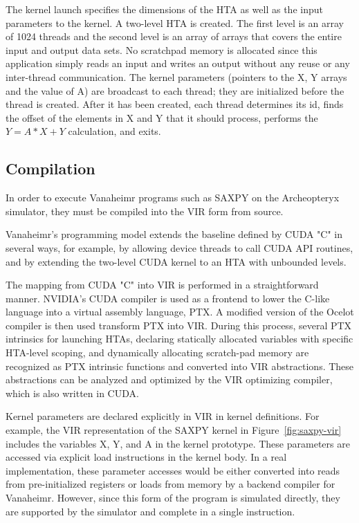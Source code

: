 \documentclass[conference, 10pt]{IEEEtran}
\begin{document}
The kernel launch specifies the dimensions of the HTA as well as the input
parameters to the kernel.  A two-level HTA is created.  The first level is an
array of 1024 threads and the second level is an array of arrays that covers
the entire input and output data sets.  No scratchpad memory is allocated since
this application simply reads an input and writes an output without any reuse
or any inter-thread communication.  The kernel parameters (pointers to the X, Y
arrays and the value of A) are broadcast to each thread; they are initialized
before the thread is created.  After it has been created, each thread determines
its id, finds the offset of the elements in X and Y that it should process,
performs the $Y = A*X+Y$ calculation, and exits.

\subsection{Compilation}

In order to execute Vanaheimr programs such as SAXPY on the Archeopteryx
simulator, they must be compiled into the VIR form from source.  

Vanaheimr's programming model extends the baseline defined by CUDA "C" in
several ways, for example, by allowing device threads to call CUDA API routines,
and by extending the two-level CUDA kernel to an HTA with unbounded levels.



The mapping from CUDA "C" into VIR is performed in a straightforward manner.
NVIDIA's CUDA compiler is used as a frontend to lower the C-like language into
a virtual assembly language, PTX.  A modified version of the Ocelot compiler is
then used transform PTX into VIR.  During this process, several PTX intrinsics
for launching HTAs, declaring statically allocated variables with specific
HTA-level scoping, and dynamically allocating scratch-pad memory are recognized
as PTX intrinsic functions and converted into VIR abstractions.  These
abstractions can be analyzed and optimized by the VIR optimizing compiler, which
is also written in CUDA.

Kernel parameters are declared explicitly in VIR in kernel definitions. 
For example, the VIR representation of the SAXPY kernel in 
Figure~\ref{fig:saxpy-vir} includes the variables X, Y, and A in the kernel
prototype.  These parameters are accessed via explicit load
instructions in the kernel body. In a real implementation, these parameter
accesses would be either converted into reads from pre-initialized registers or
loads from memory by a backend compiler for Vanaheimr.  However, since this
form of the program is simulated directly, they are supported by the simulator
and complete in a single instruction.
\end{document}
